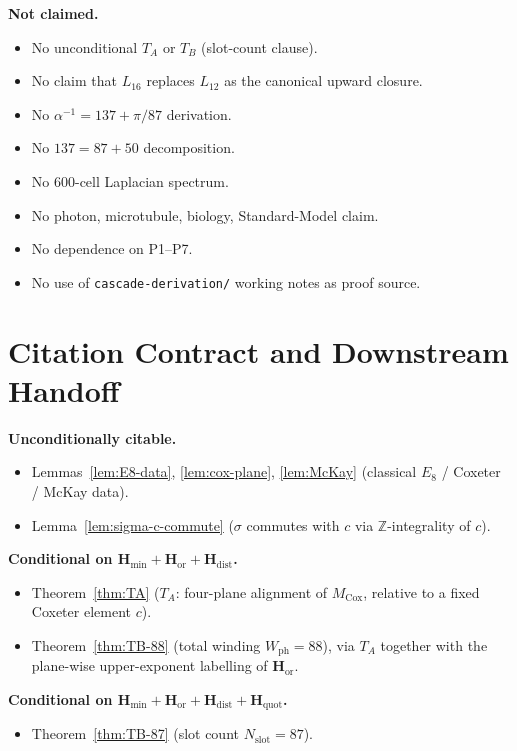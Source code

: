 \documentclass[11pt, a4paper]{amsart}
\theoremstyle{definition}
\newcommand{\Z}{\mathbb{Z}}
\newcommand{\Hmin}{\mathbf{H}_{\min}}
\newcommand{\Hor}{\mathbf{H}_{\mathrm{or}}}
\newcommand{\Hdist}{\mathbf{H}_{\mathrm{dist}}}
\newcommand{\Hquot}{\mathbf{H}_{\mathrm{quot}}}
\newcommand{\Mcox}{M_{\mathrm{Cox}}}
\newcommand{\Wph}{W_{\mathrm{ph}}}
\newcommand{\Nslot}{N_{\mathrm{slot}}}
\begin{document}
\textbf{Not claimed.}
\begin{itemize}
\item No unconditional $T_A$ or $T_B$ (slot-count clause).
\item No claim that $L_{16}$ replaces $L_{12}$ as the
  canonical upward closure.
\item No $\alpha^{-1} = 137 + \pi/87$ derivation.
\item No $137 = 87 + 50$ decomposition.
\item No $600$-cell Laplacian spectrum.
\item No photon, microtubule, biology, Standard-Model claim.
\item No dependence on P1--P7.
\item No use of \texttt{cascade-derivation/} working notes
  as proof source.
\end{itemize}

\section{Citation Contract and Downstream Handoff}
\label{sec:handoff}

\textbf{Unconditionally citable.}
\begin{itemize}
\item Lemmas~\ref{lem:E8-data}, \ref{lem:cox-plane},
  \ref{lem:McKay} (classical $E_8$ / Coxeter / McKay data).
\item Lemma~\ref{lem:sigma-c-commute} ($\sigma$ commutes with
  $c$ via $\Z$-integrality of $c$).
\end{itemize}

\textbf{Conditional on $\Hmin + \Hor + \Hdist$.}
\begin{itemize}
\item Theorem~\ref{thm:TA} ($T_A$: four-plane alignment of
  $\Mcox$, relative to a fixed Coxeter element $c$).
\item Theorem~\ref{thm:TB-88} (total winding $\Wph = 88$),
  via $T_A$ together with the plane-wise upper-exponent
  labelling of $\Hor$.
\end{itemize}

\textbf{Conditional on $\Hmin + \Hor + \Hdist + \Hquot$.}
\begin{itemize}
\item Theorem~\ref{thm:TB-87} (slot count $\Nslot = 87$).
\end{itemize}
\end{document}
